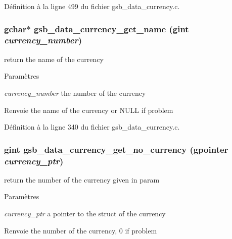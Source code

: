Définition à la ligne 499 du fichier gsb\_\-data\_\-currency.c.

\subsubsection[{gsb\_\-data\_\-currency\_\-get\_\-name}]{\setlength{\rightskip}{0pt plus 5cm}gchar$\ast$ gsb\_\-data\_\-currency\_\-get\_\-name (gint {\em currency\_\-number})}\label{gsb__data__currency_8h_a0120c1acd462d7ad69ae349d74b23a34}
return the name of the currency


\begin{DoxyParams}{Paramètres}
\item[{\em currency\_\-number}]the number of the currency\end{DoxyParams}
\begin{DoxyReturn}{Renvoie}
the name of the currency or NULL if problem 
\end{DoxyReturn}


Définition à la ligne 340 du fichier gsb\_\-data\_\-currency.c.

\subsubsection[{gsb\_\-data\_\-currency\_\-get\_\-no\_\-currency}]{\setlength{\rightskip}{0pt plus 5cm}gint gsb\_\-data\_\-currency\_\-get\_\-no\_\-currency (gpointer {\em currency\_\-ptr})}\label{gsb__data__currency_8h_acaa91f6f1dbf289f4f00a0f598cdbfd4}
return the number of the currency given in param


\begin{DoxyParams}{Paramètres}
\item[{\em currency\_\-ptr}]a pointer to the struct of the currency\end{DoxyParams}
\begin{DoxyReturn}{Renvoie}
the number of the currency, 0 if problem 
\end{DoxyReturn}


